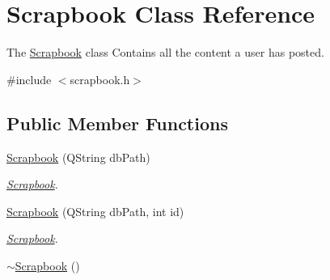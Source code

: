 \hypertarget{classScrapbook}{}\section{Scrapbook Class Reference}
\label{classScrapbook}


The \hyperlink{classScrapbook}{Scrapbook} class Contains all the content a user has posted.  




{\ttfamily \#include $<$scrapbook.\+h$>$}

\subsection*{Public Member Functions}
\begin{DoxyCompactItemize}
\item 
\hyperlink{classScrapbook_af20366c87e4d29c13633ebd684e54be8}{Scrapbook} (Q\+String db\+Path)
\begin{DoxyCompactList}\small\item\em \hyperlink{classScrapbook}{Scrapbook}. \end{DoxyCompactList}\item 
\hyperlink{classScrapbook_a3eb90c9dd4bdf2b35871aff161c8abeb}{Scrapbook} (Q\+String db\+Path, int id)
\begin{DoxyCompactList}\small\item\em \hyperlink{classScrapbook}{Scrapbook}. \end{DoxyCompactList}\item 
\hyperlink{classScrapbook_a7130a2a96c585d0729de5c5798250b87}{$\sim$\+Scrapbook} ()\hypertarget{classScrapbook_a7130a2a96c585d0729de5c5798250b87}{}\label{classScrapbook_a7130a2a96c585d0729de5c5798250b87}


\end{DoxyCompactItemize}
